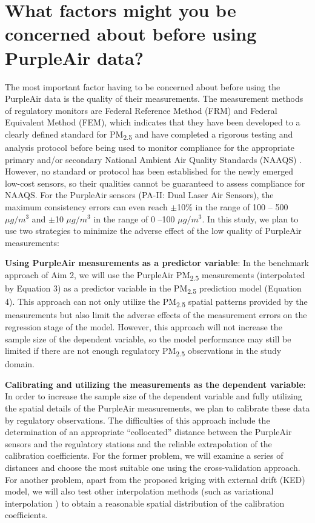 \documentclass[11pt]{article}
\newcommand{\tsub}{\textsubscript}
\begin{document}
\section{What factors might you be concerned about before using PurpleAir data?}
The most important factor having to be concerned about before using the PurpleAir data is the quality of their measurements. The measurement methods of regulatory monitors are Federal Reference Method (FRM) and Federal Equivalent Method (FEM), which indicates that they have been developed to a clearly defined standard for PM\tsub{2.5} and have completed a rigorous testing and analysis protocol before being used to monitor compliance for the appropriate primary and/or secondary National Ambient Air Quality Standards (NAAQS) \citep{hall2014integrating}. However, no standard or protocol has been established for the newly emerged low-cost sensors, so their qualities cannot be guaranteed to assess compliance for NAAQS. For the PurpleAir sensors (PA-II: Dual Laser Air Sensors), the maximum consistency errors can even reach $\pm$10\% in the range of 100 -- 500 $\mu g/m^3$ and $\pm$10 $\mu g/m^3$ in the range of 0 --100 $\mu g/m^3$. In this study, we plan to use two strategies to minimize the adverse effect of the low quality of PurpleAir measurements:
\begin{enumerate*}[{[1)]}]
    \item \textbf{Using PurpleAir measurements as a predictor variable}: In the benchmark approach of Aim 2, we will use the PurpleAir PM\tsub{2.5} measurements (interpolated by Equation 3) as a predictor variable in the PM\tsub{2.5} prediction model (Equation 4). This approach can not only utilize the PM\tsub{2.5} spatial patterns provided by the measurements but also limit the adverse effects of the measurement errors on the regression stage of the model. However, this approach will not increase the sample size of the dependent variable, so the model performance may still be limited if there are not enough regulatory PM\tsub{2.5} observations in the study domain. 
    \item \textbf{Calibrating and utilizing the measurements as the dependent variable}: In order to increase the sample size of the dependent variable and fully utilizing the spatial details of the PurpleAir measurements, we plan to calibrate these data by regulatory observations. The difficulties of this approach include the determination of an appropriate ``collocated'' distance between the PurpleAir sensors and the regulatory stations and the reliable extrapolation of the calibration coefficients. For the former problem, we will examine a series of distances and choose the most suitable one using the cross-validation approach. For another problem, apart from the proposed kriging with external drift (KED) model, we will also test other interpolation methods (such as variational interpolation \citep{turk1999shape}) to obtain a reasonable spatial distribution of the calibration coefficients. 
\end{enumerate*}
\end{document}
